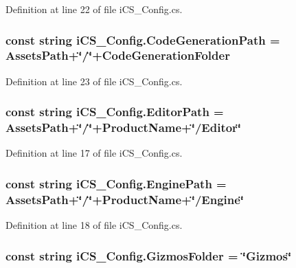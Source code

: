 Definition at line 22 of file i\+C\+S\+\_\+\+Config.\+cs.

\hypertarget{classi_c_s___config_a5d73558b0fff9dac84766a3626da6a57}{
\subsubsection[{Code\+Generation\+Path}]{\setlength{\rightskip}{0pt plus 5cm}const string i\+C\+S\+\_\+\+Config.\+Code\+Generation\+Path = {\bf Assets\+Path}+\char`\"{}/\char`\"{}+{\bf Code\+Generation\+Folder}}}\label{classi_c_s___config_a5d73558b0fff9dac84766a3626da6a57}


Definition at line 23 of file i\+C\+S\+\_\+\+Config.\+cs.

\hypertarget{classi_c_s___config_a97f62a34e25595599ce79964a3f51bc5}{
\subsubsection[{Editor\+Path}]{\setlength{\rightskip}{0pt plus 5cm}const string i\+C\+S\+\_\+\+Config.\+Editor\+Path = {\bf Assets\+Path}+\char`\"{}/\char`\"{}+{\bf Product\+Name}+\char`\"{}/Editor\char`\"{}}}\label{classi_c_s___config_a97f62a34e25595599ce79964a3f51bc5}


Definition at line 17 of file i\+C\+S\+\_\+\+Config.\+cs.

\hypertarget{classi_c_s___config_a2f5403f52111ed8b128f97d3b4c7127d}{
\subsubsection[{Engine\+Path}]{\setlength{\rightskip}{0pt plus 5cm}const string i\+C\+S\+\_\+\+Config.\+Engine\+Path = {\bf Assets\+Path}+\char`\"{}/\char`\"{}+{\bf Product\+Name}+\char`\"{}/Engine\char`\"{}}}\label{classi_c_s___config_a2f5403f52111ed8b128f97d3b4c7127d}


Definition at line 18 of file i\+C\+S\+\_\+\+Config.\+cs.

\hypertarget{classi_c_s___config_ab6c5e096caef44eeea54b2750d4a623e}{
\subsubsection[{Gizmos\+Folder}]{\setlength{\rightskip}{0pt plus 5cm}const string i\+C\+S\+\_\+\+Config.\+Gizmos\+Folder = \char`\"{}Gizmos\char`\"{}}}\label{classi_c_s___config_ab6c5e096caef44eeea54b2750d4a623e}


